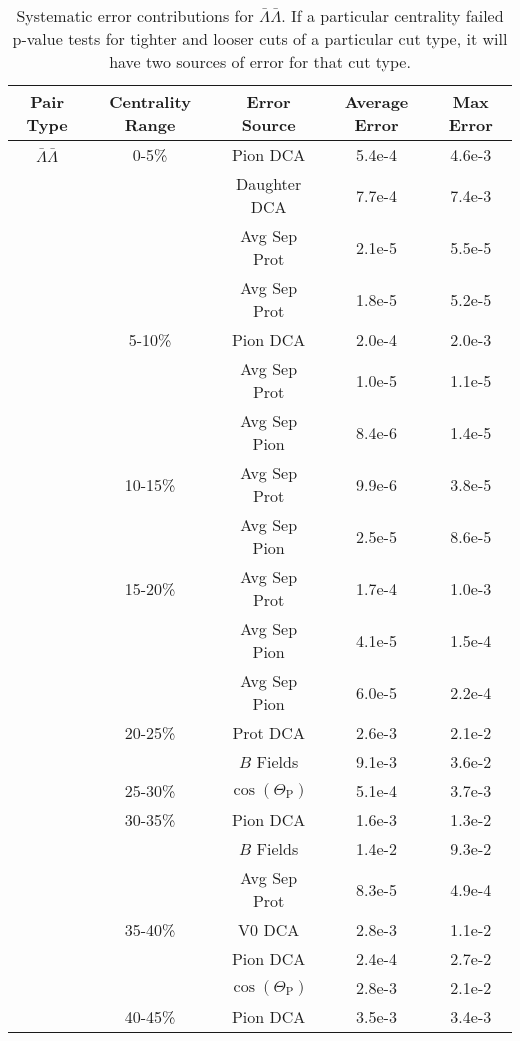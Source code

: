 \begin{table}
\caption[Systematic error contributions for $\bar{\Lambda}\bar{\Lambda}$] {Systematic error contributions for $\bar{\Lambda}\bar{\Lambda}$.  
If a particular centrality failed p-value tests for tighter and looser cuts of a particular cut type, it will have two sources of error for that cut type.} \label{tab:SysErrorSourcesAA} 
\begin{center}
\begin{tabular}{| c | c | c | c | c |}
  \hline                         
  Pair Type & Centrality Range & Error Source & Average Error & Max Error \\
  \hline 
  $\bar{\Lambda}\bar{\Lambda}$ & 0-5\% & Pion DCA & 5.4e-4 & 4.6e-3 \\
   &        & Daughter DCA & 7.7e-4 & 7.4e-3 \\
   &        & Avg Sep Prot & 2.1e-5 & 5.5e-5 \\
   &         & Avg Sep Prot & 1.8e-5 & 5.2e-5 \\
   & 5-10\% & Pion DCA & 2.0e-4 & 2.0e-3 \\
   &         & Avg Sep Prot & 1.0e-5 & 1.1e-5 \\
   &         & Avg Sep Pion & 8.4e-6 & 1.4e-5 \\
   & 10-15\% & Avg Sep Prot & 9.9e-6 & 3.8e-5 \\
   &         & Avg Sep Pion & 2.5e-5 & 8.6e-5 \\
   & 15-20\% & Avg Sep Prot & 1.7e-4 & 1.0e-3 \\
   &         & Avg Sep Pion & 4.1e-5 & 1.5e-4 \\
   &         & Avg Sep Pion & 6.0e-5 & 2.2e-4 \\
   & 20-25\% & Prot DCA & 2.6e-3 & 2.1e-2 \\
   &         & $B$ Fields & 9.1e-3 & 3.6e-2 \\
   & 25-30\% & $\cos(\Theta_{\mathrm{P}})$ & 5.1e-4 & 3.7e-3 \\
   & 30-35\% & Pion DCA & 1.6e-3 & 1.3e-2 \\
   &         & $B$ Fields & 1.4e-2 & 9.3e-2 \\
   &         & Avg Sep Prot & 8.3e-5 & 4.9e-4 \\
   & 35-40\% & V0 DCA & 2.8e-3 & 1.1e-2 \\
   &         & Pion DCA & 2.4e-4 & 2.7e-2 \\
   &         & $\cos(\Theta_{\mathrm{P}})$ & 2.8e-3 & 2.1e-2 \\
   & 40-45\% & Pion DCA & 3.5e-3 & 3.4e-3 \\

\end{tabular}
\end{center}
\end{table}
